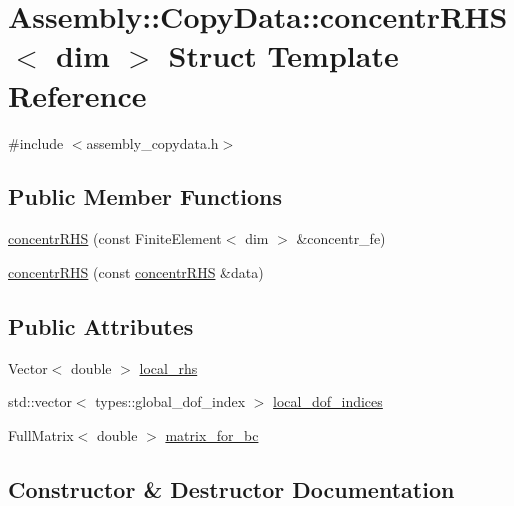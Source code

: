 \hypertarget{struct_assembly_1_1_copy_data_1_1concentr_r_h_s}{}\section{Assembly\+:\+:Copy\+Data\+:\+:concentr\+R\+H\+S$<$ dim $>$ Struct Template Reference}
\label{struct_assembly_1_1_copy_data_1_1concentr_r_h_s}


{\ttfamily \#include $<$assembly\+\_\+copydata.\+h$>$}

\subsection*{Public Member Functions}
\begin{DoxyCompactItemize}
\item 
\hyperlink{struct_assembly_1_1_copy_data_1_1concentr_r_h_s_adc0bbc1d0ab17592b775f1f3e10fce99}{concentr\+R\+H\+S} (const Finite\+Element$<$ dim $>$ \&concentr\+\_\+fe)
\item 
\hyperlink{struct_assembly_1_1_copy_data_1_1concentr_r_h_s_a28690ab676550d9de1b9b14f0c92e89b}{concentr\+R\+H\+S} (const \hyperlink{struct_assembly_1_1_copy_data_1_1concentr_r_h_s}{concentr\+R\+H\+S} \&data)
\end{DoxyCompactItemize}
\subsection*{Public Attributes}
\begin{DoxyCompactItemize}
\item 
Vector$<$ double $>$ \hyperlink{struct_assembly_1_1_copy_data_1_1concentr_r_h_s_aa16d978b90728b2e6118f642cd012d53}{local\+\_\+rhs}
\item 
std\+::vector$<$ types\+::global\+\_\+dof\+\_\+index $>$ \hyperlink{struct_assembly_1_1_copy_data_1_1concentr_r_h_s_a5e754dc8716eaebaeee1144ad1c59f16}{local\+\_\+dof\+\_\+indices}
\item 
Full\+Matrix$<$ double $>$ \hyperlink{struct_assembly_1_1_copy_data_1_1concentr_r_h_s_af68abcf2cce508ca241f8a57a4160b5d}{matrix\+\_\+for\+\_\+bc}
\end{DoxyCompactItemize}


\subsection{Constructor \& Destructor Documentation}
\hypertarget{struct_assembly_1_1_copy_data_1_1concentr_r_h_s_adc0bbc1d0ab17592b775f1f3e10fce99}{}
